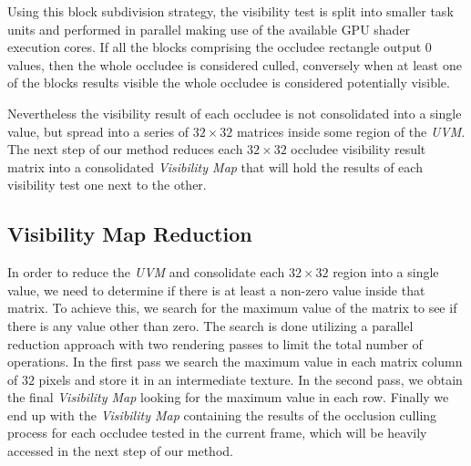 \documentclass[10pt, conference]{IEEEtran}
\begin{document}
Using this block subdivision strategy, the visibility test is split into smaller task units and performed in parallel making use of the available GPU shader execution cores. 
If all the blocks comprising the occludee rectangle output $0$ values, then the whole occludee is considered culled, conversely when at 
least one of the blocks results visible the whole occludee is considered potentially visible.\\

\begin{figure}[!hbp]
\end{figure}


Nevertheless the visibility result of each occludee is not consolidated into a single value, but spread into a series of $32 \times 32$ matrices inside some region of the \emph{UVM}. 
The next step of our method reduces each $32 \times 32$ occludee visibility result matrix into a consolidated \emph{Visibility Map} that will hold the results of each visibility test one next to the other.\\

\subsection{Visibility Map Reduction}
%
In order to reduce the \emph{UVM} and consolidate each $32 \times 32$ region into a single value, we need to determine if there is at least a non-zero value inside that matrix. 
To achieve this, we search for the maximum value of the matrix to see if there is any value other than zero. 
The search is done utilizing a parallel reduction approach with two rendering passes to limit the total number of operations. 
In the first pass we search the maximum value in each matrix column of $32$ pixels and store it in an intermediate texture. 
In the second pass, we obtain the final \emph{Visibility Map} looking for the maximum value in each row. 
Finally we end up with the \emph{Visibility Map} containing the results of the occlusion culling process for each occludee tested in the current frame, which will be heavily accessed in the next step of our method. 


\end{document}
